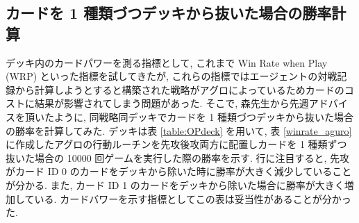 \documentclass{jarticle}     %
\begin{document}
\subsection{カードを 1 種類づつデッキから抜いた場合の勝率計算}
デッキ内のカードパワーを測る指標として, これまで Win Rate when Play (WRP) といった指標を試してきたが, これらの指標ではエージェントの対戦記録から計算しようとすると構築された戦略がアグロによっているためカードのコストに結果が影響されてしまう問題があった. そこで, 森先生から先週アドバイスを頂いたように, 同戦略同デッキでカードを 1 種類づつデッキから抜いた場合の勝率を計算してみた. デッキは表 \ref{table:OPdeck} を用いて, 表 \ref{winrate_aguro} に作成したアグロの行動ルーチンを先攻後攻両方に配置しカードを 1 種類ずつ抜いた場合の 10000 回ゲームを実行した際の勝率を示す.
行に注目すると, 先攻がカード ID 0 のカードをデッキから除いた時に勝率が大きく減少していることが分かる. また, カード ID 1 のカードをデッキから除いた場合に勝率が大きく増加している.
カードバワーを示す指標としてこの表は妥当性があることが分かった. 
\end{document}
